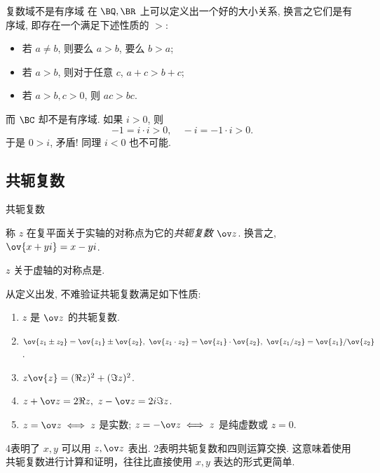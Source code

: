 \begin{frame}{复数域不是有序域\noexer}
	\onslide<+->
	在 $\BQ,\BR$ 上可以定义出一个好的大小关系,
	\onslide<+->
	换言之它们是有序域, 即存在一个满足下述性质的 $>$:
	\begin{itemize}\bf
		\item 若 $a\neq b$, 则要么 $a>b$, 要么 $b>a$;
		\item 若 $a>b$, 则对于任意 $c$, $a+c>b+c$;
		\item 若 $a>b,c>0$, 则 $ac>bc$.
	\end{itemize}
	\onslide<+->
	而 \alert{$\BC$ 却不是有序域}.
	\onslide<+->
	如果 $i>0$, 则
		\[-1=i\cdot i>0,\quad -i=-1\cdot i>0.\]
	\onslide<+->
	于是 $0>i$, 矛盾! 同理 $i<0$ 也不可能.
\end{frame}


\subsection{共轭复数}

\begin{frame}{共轭复数}
	\onslide<+->
	\begin{definition}
		称 $z$ 在复平面关于实轴的对称点为它的\emph{共轭复数 $\ov z$}.
	换言之, $\ov{x+yi}=x-yi$.
	\end{definition}
	\onslide<+->
	\begin{exercise}
		$z$ 关于虚轴的对称点是.
	\end{exercise}
	\onslide<+->
	从定义出发, 不难验证共轭复数满足如下性质:
	\begin{enumerate}\bf
		\item $z$ 是 $\ov z$ 的共轭复数.
		\item $\ov{z_1\pm z_2}=\ov{z_1}\pm\ov{z_2},\ 
		\ov{z_1\cdot z_2}=\ov{z_1}\cdot\ov{z_2},\ 
		\ov{z_1/z_2}=\ov{z_1}/\ov{z_2}$.
		\item $z\ov{z}=(\Re z)^2+(\Im z)^2$.
		\item $z+\ov z=2\Re z,\ z-\ov z=2i\Im z$.
		\item $z=\ov z\iff z$ 是实数; $z=-\ov z\iff z$ 是纯虚数或 $z=0$.
	\end{enumerate}
	\onslide<+->
	\enumnum4表明了 $x,y$ 可以用 $z,\ov z$ 表出.
	\onslide<+->
	\enumnum2表明共轭复数和四则运算交换.
	\onslide<+->
	这意味着使用共轭复数进行计算和证明，往往比直接使用 $x,y$ 表达的形式更简单.
\end{frame}


